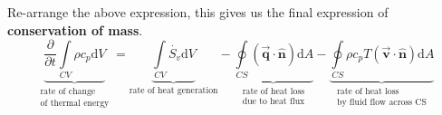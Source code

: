 \documentclass[12pt, a4paper]{article}
\numberwithin{equation}{subsection}
\begin{document}
Re-arrange the above expression, this gives us the final expression of \textbf{conservation of mass}.
\begin{equation}
\label{eqn:mass_conserve}
    \boxed{ 
    \underbrace{\frac{\partial}{\partial t} \int\limits_{CV} \rho c_{p} \mathrm{d}V}_{\substack{\text{rate of change}\\\text{of thermal energy}}} 
    = \underbrace{\int\limits_{CV} \dot{S_{v}} \mathrm{d}V}_{\text{rate of heat generation}} 
    - \underbrace{\oint\limits_{CS} (\vec{\bm{q}} \cdot \bm{\hat{n}}) \mathrm{d}A}_{\substack{\text{rate of heat loss}\\\text{due to heat flux}}} 
    - \underbrace{\oint\limits_{CS} \rho c_{p} T (\vec{\bm{v}} \cdot \bm{\hat{n}}) \mathrm{d}A}_{\substack{\text{rate of heat loss}\\ \text{by fluid flow across CS}}} 
}
\end{equation}
\end{document}

